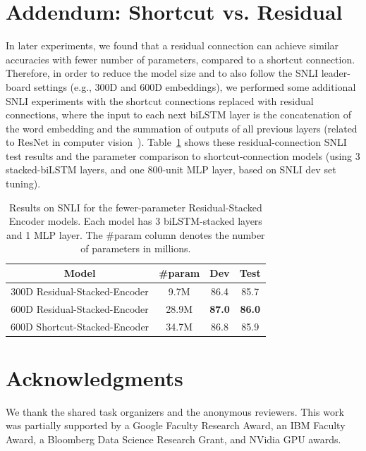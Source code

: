 \documentclass[11pt,letterpaper]{article}
\begin{document}
\section{Addendum: Shortcut vs. Residual}
In later experiments, we found that a residual connection can achieve similar accuracies with fewer number of parameters, compared to a shortcut connection. Therefore, in order to reduce the model size and to also follow the SNLI leader-board settings (e.g., 300D and 600D embeddings), we performed some additional SNLI experiments with the shortcut connections replaced with residual connections, where the input to each next biLSTM layer is the concatenation of the word embedding and the summation of outputs of all previous layers (related to ResNet in computer vision~\cite{he2016deep}).
Table~\ref{tab:test_snli_table} shows these residual-connection SNLI test results and the parameter comparison to shortcut-connection models (using 3 stacked-biLSTM layers, and one 800-unit MLP layer, based on SNLI dev set tuning).


\begin{table}[ht]
\begin{center}
\small
\begin{tabular}{|c|ccc|}
\hline
{\bf Model} & {\bf \#param} & {\bf Dev}  & {\bf Test} \\
\hline
300D Residual-Stacked-Encoder & 9.7M & 86.4 & 85.7\\
600D Residual-Stacked-Encoder & 28.9M & \textbf{87.0} & \textbf{86.0}\\
\hline
600D Shortcut-Stacked-Encoder & 34.7M & 86.8 & 85.9\\
\hline
\end{tabular}
\end{center}
\caption{Results on SNLI for the fewer-parameter Residual-Stacked Encoder models. Each model has 3 biLSTM-stacked layers and 1 MLP layer. The \#param column denotes the number of parameters in millions.}\label{tab:test_snli_table}
\end{table}


\section*{Acknowledgments}
We thank the shared task organizers and the anonymous reviewers. This work was partially supported by a Google
Faculty Research Award, an IBM Faculty Award,
a Bloomberg Data Science Research Grant, and
NVidia GPU awards.




\end{document}
